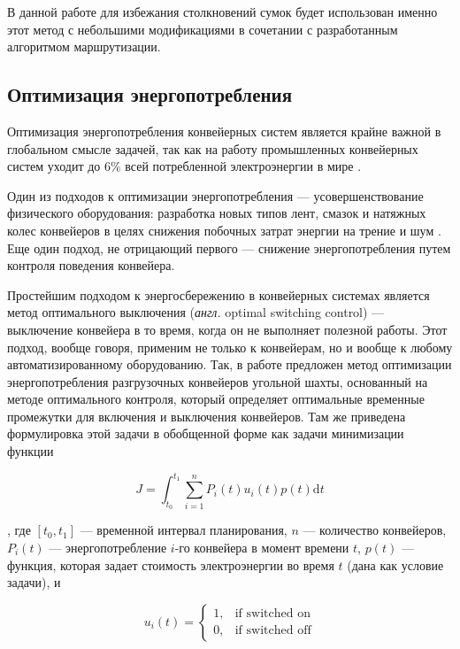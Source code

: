 \documentclass[specification,annotation,times]{itmo-student-thesis}
\theoremstyle{definition}
\begin{document}
В данной работе для избежания столкновений сумок будет использован именно этот
метод с небольшими модификациями в сочетании с разработанным алгоритмом маршрутизации.

\subsection{Оптимизация энергопотребления}\label{overview:energy}

Оптимизация энергопотребления конвейерных систем является крайне важной в
глобальном смысле задачей, так как на работу промышленных конвейерных систем
уходит до 6\% всей потребленной электроэнергии в мире \cite{halepoto2016design}.

Один из подходов к оптимизации энергопотребления --- усовершенствование
физического оборудования: разработка новых типов лент, смазок и натяжных колес
конвейеров в целях снижения побочных затрат энергии на трение и шум
\cite{staniak1996energy}. Еще один подход, не отрицающий первого --- снижение
энергопотребления путем контроля поведения конвейера.

Простейшим подходом к энергосбережению в конвейерных системах является
метод оптимального выключения (\textit{англ.} optimal switching control) ---
выключение конвейера в то время, когда он не выполняет полезной работы. Этот
подход, вообще говоря, применим не только к конвейерам, но и вообще к любому
автоматизированному оборудованию. Так, в работе
\cite{middelberg2009optimal} предложен метод оптимизации энергопотребления
разгрузочных конвейеров угольной шахты, основанный на методе оптимального
контроля, который определяет оптимальные временные промежутки для включения и
выключения конвейеров. Там же приведена формулировка этой задачи в обобщенной
форме как задачи минимизации функции

\begin{equation}\label{energy:opt-switching-J}
  J = \int_{t_0}^{t_1} \! \sum\limits_{i=1}^n P_i(t) u_i(t) p(t) \mathrm{d}t
\end{equation}

, где $[t_0, t_1]$ --- временной интервал планирования, $n$ --- количество
конвейеров, $P_i(t)$ --- энергопотребление $i$-го конвейера в момент времени
$t$, $p(t)$ --- функция, которая задает стоимость электроэнергии во время $t$
(дана как условие задачи), и

\begin{equation}\label{energy:opt-switching-u}
  u_i(t) = \begin{cases}
    1, & \text{if switched on}\\
    0, & \text{if switched off}
  \end{cases}
\end{equation}
\end{document}
